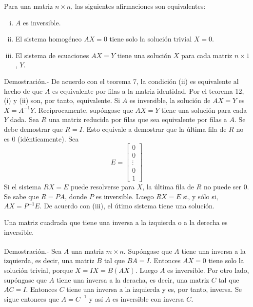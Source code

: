 \begin{teo}
    Para una matriz $n\times n$, las siguientes afirmaciones son equivalentes:
    \begin{enumerate}[(i)]
	\item $A$ es inversible.
	\item El sistema homogéneo $AX=0$ tiene solo la solución trivial $X=0$.
	\item El sistema de ecuaciones $AX=Y$ tiene una solución $X$ para cada matriz $n\times 1$, $Y$.\\
    \end{enumerate}
	Demostración.-\; De acuerdo con el teorema 7, la condición (ii) es equivalente al hecho de que $A$ es equivalente por filas a la matriz identidad. Por el teorema 12, (i) y (ii) son, por tanto, equivalente. Si $A$ es inversible, la solución de $AX=Y$ es $X=A^{-1}Y$. Recíprocamente, supóngase que $AX=Y$ tiene una solución para cada $Y$ dada. Sea $R$ una matriz reducida por filas que sea equivalente por filas a $A$. Se debe demostrar que $R=I$. Esto equivale a demostrar que la última fila de $R$ no es $0$ (idénticamente). Sea
	$$
	E = 
	\left[
	    \begin{array}{c}
		0 \\
		0 \\
		\vdots \\
		0 \\
		1
	    \end{array}
	\right]
	$$
    Si el sistema $RX=E$ puede resolverse para $X$, la última fila de $R$ no puede ser $0$. Se sabe que $R=PA$, donde $P$ es inversible. Luego $RX=E$ si, y sólo si, $AX=P^{-1}E$. De acuerdo con (iii), el útimo sistema tiene una solución.
\end{teo}

\begin{cor}
    Una matriz cuadrada que tiene una inversa a la izquierda o a la derecha es inversible.\\\\
	Demostración.-\; Sea $A$ una matriz $m\times n$. Supóngase que $A$ tiene una inversa a la izquierda, es decir, una matriz $B$ tal que $BA=I$. Entonces $AX=0$ tiene solo la solución trivial, porque $X=IX=B(AX)$. Luego $A$ es inversible. Por otro lado, supóngase que $A$ tiene una inversa a la deracha, es decir, una matriz $C$ tal que $AC=I$. Entonces $C$ tiene una inversa a la izquierda y es, por tanto, inversa. Se sigue entonces que $A=C^{-1}$ y así $A$ es inversible con inversa $C$.
\end{cor}

